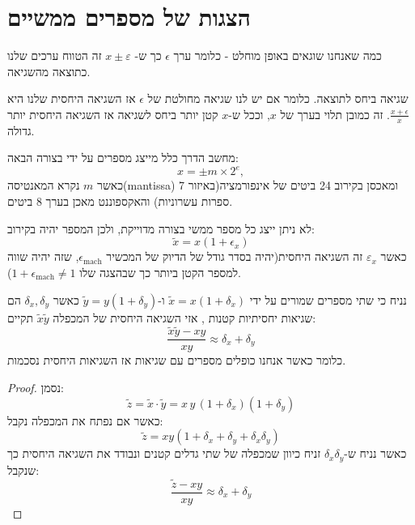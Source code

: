 \documentclass{tstextbook}
\begin{document}
\section{הצגות של מספרים ממשיים}

\begin{definition}
כמה שאנחנו שוגאים באופן מוחלט - כלומר ערך \(\epsilon\) כך ש- \(x\pm \varepsilon\) זה הטווח ערכים שלנו כתוצאה מהשגיאה.

\end{definition}
\begin{definition}
שגיאה ביחס לתוצאה. כלומר אם יש לנו שגיאה מחולטת של \(\epsilon\) אז השגיאה היחסית שלנו היא \(\frac{x+\epsilon}{x}\). זה כמובן תלוי בערך של \(x\), וככל ש-\(x\) קטן יותר ביחס לשגיאה אז השגיאה היחסית יותר גדולה.

\end{definition}
\begin{proposition}
מחשב הדרך כלל מייצג מספרים על ידי בצורה הבאה:
$$x=\pm m\times2^{e},$$
כאשר \(m\) נקרא המאנטיסה(mantissa) ומאכסן בקירוב 24 ביטים של אינפורמציה(באיזור 7 ספרות עשרוניות) והאקספוננט מאכן בערך 8 ביטים.

\end{proposition}
\begin{corollary}
לא ניתן ייצג כל מספר ממשי בצורה מדוייקת, ולכן המספר יהיה בקירוב:
$$\tilde{x}=x(1+\epsilon_{x})$$
כאשר \(\varepsilon_{x}\) זה השגיאה היחסית(יהיה בסדר גודל של הדיוק של המכשיר \(\epsilon_{\text{mach}}\), שזה יהיה שווה למספר הקטן ביותר כך שבהצגה שלו \(1+\epsilon_{\text{mach}}\neq 1\)).

\end{corollary}
\begin{proposition}
נניח כי שתי מספרים שמורים על ידי \(\tilde{x}=x(1+\delta_{x})\) ו-\(\tilde{y}=y(1+\delta_{y})\) כאשר \(\delta_{x},\delta_{y}\) הם שגיאות יחסיתיות קטנות , אזי השגיאה היחסית של המכפלה \(\tilde{x}\tilde{y}\) תקיים:
$$\frac{\tilde{x}\tilde{y}-xy}{xy}\approx \delta_{x}+\delta_{y}$$
כלומר כאשר אנחנו כופלים מספרים עם שגיאות אז השגיאות היחסית נסכמות.

\end{proposition}
\begin{proof}
נסמן:
$$\tilde{z}=\tilde{x}\cdot\tilde{y}=x\,y\,(1+\delta_{x})(1+\delta_{y})$$
כאשר אם נפתח את המכפלה נקבל:
$$\tilde{z}=x y\left(1+\delta_{x}+\delta_{y}+\delta_{x}\delta_{y}\right)$$
כאשר נניח ש-\(\delta_{x}\delta_{y}\) זניח כיוון שמכפלה של שתי גדלים קטנים ונבודד את השגיאה היחסית כך שנקבל:
$${\frac{\tilde{z}-x y}{x y}}\approx\delta_{x}+\delta_{y}$$

\end{proof}
\end{document}
